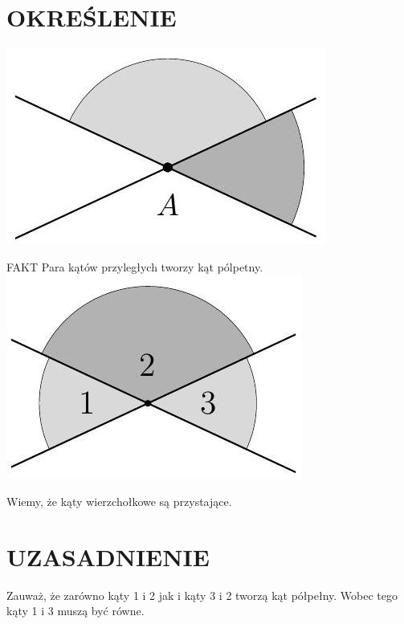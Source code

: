 \documentclass[10pt]{article}
\begin{document}
\section*{OKREŚLENIE}
\begin{center}
\includegraphics[max width=\textwidth]{2024_11_21_8f01584889ff06348ae7g-186(3)}
\end{center}

FAKT Para kątów przyległych tworzy kąt pólpetny.\\
\includegraphics[max width=\textwidth, center]{2024_11_21_8f01584889ff06348ae7g-186}

Wiemy, że kąty wierzchołkowe są przystające.

\section*{UZASADNIENIE}
Zauważ, że zarówno kąty 1 i 2 jak i kąty 3 i 2 tworzą kąt półpełny. Wobec tego kąty 1 i 3 muszą być równe.
\end{document}
